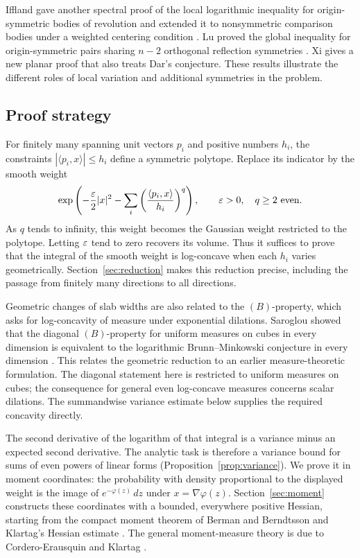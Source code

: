 Iffland gave another spectral proof of the local logarithmic inequality
for origin-symmetric bodies of revolution and extended it to nonsymmetric
comparison bodies under a weighted centering condition
\cite[Theorem~A]{Iffland2026}.
Lu proved the global inequality for origin-symmetric pairs sharing
$n-2$ orthogonal reflection symmetries
\cite[Theorems~1.2 and~1.3]{Lu2026}.
Xi \cite[Theorem~1.1]{Xi2026} gives a new planar proof that also treats
Dar's conjecture. These results illustrate the different roles of
local variation and additional symmetries in the problem.

\subsection*{Proof strategy}
For finitely many spanning unit vectors $p_i$ and positive numbers $h_i$, the
constraints $|\langle p_i,x\rangle|\le h_i$ define a symmetric
polytope. Replace its indicator by the smooth weight
\[
 \exp\left(-\frac{\varepsilon}{2}|x|^2
       -\sum_i\left(\frac{\langle p_i,x\rangle}{h_i}\right)^q\right),
 \qquad \varepsilon>0,\quad q\ge2\text{ even}.
\]
As $q$ tends to infinity, this weight becomes the Gaussian weight
restricted to the polytope. Letting $\varepsilon$ tend to zero recovers its
volume. Thus it suffices to prove that the integral of the smooth
weight is log-concave when each $h_i$ varies geometrically.
Section~\ref{sec:reduction} makes this reduction precise, including
the passage from finitely many directions to all directions.

Geometric changes of slab widths are also related to the $(B)$-property,
which asks for log-concavity of measure under exponential dilations.
Saroglou showed that the diagonal $(B)$-property for uniform measures on
cubes in every dimension is equivalent to the logarithmic
Brunn--Minkowski conjecture in every dimension
\cite[Theorem~1.5]{Saroglou2015}. This relates the geometric reduction to
an earlier measure-theoretic formulation. The diagonal statement here is
restricted to uniform measures on cubes; the consequence for general even
log-concave measures concerns scalar dilations. The summandwise variance
estimate below supplies the required concavity directly.

The second derivative of the logarithm of that integral is a variance
minus an expected second derivative. The analytic task is therefore a
variance bound for sums of even powers of linear forms
(Proposition~\ref{prop:variance}). We prove it in moment coordinates:
the probability with density proportional to the displayed weight is
the image of $e^{-\varphi(z)}\,dz$ under $x=\nabla\varphi(z)$.
Section~\ref{sec:moment} constructs these coordinates with a bounded,
everywhere positive Hessian, starting from the compact moment theorem
of Berman and Berndtsson \cite{BermanBerndtsson2013} and Klartag's
Hessian estimate \cite{KlartagArxiv2013}. The general moment-measure
theory is due to Cordero-Erausquin and Klartag \cite{CEK2015}.

